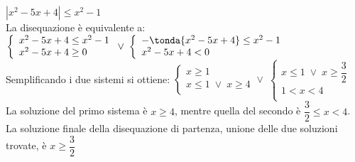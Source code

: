 \begin{esempio} $|x^2-5x+4|\leq x^2-1$\\[4pt] La disequazione è equivalente a:
\(\left\lbrace 
\begin{array}{l}
x^2-5x+4\leq x^2-1\\
x^2-5x+4\geq 0\\
\end{array}
\right.
\vee \;
\left\lbrace 
\begin{array}{l}
-\tonda{x^2-5x+4}\leq x^2-1\\
x^2-5x+4< 0\\
\end{array}
\right.\) \\[4pt]
Semplificando i due sistemi si ottiene:
\(\left\lbrace 
\begin{array}{l}
x\geq 1\\
x \leq 1 \; \vee \; x \geq 4\\
\end{array}
\right.
\vee \;
\left\lbrace 
\begin{array}{l}
x\leq 1 \; \vee \;x \geq \dfrac{3}{2}\\[6pt]
1< x < 4\\
\end{array}
\right.\) \\[4pt]
La soluzione del primo sistema è \(x \geq 4\), mentre quella del secondo è \(\dfrac{3}{2}\leq x <4\).
La soluzione finale della disequazione di partenza, unione delle due soluzioni trovate, è \(x \geq \dfrac{3}{2}\)
\end{esempio}









